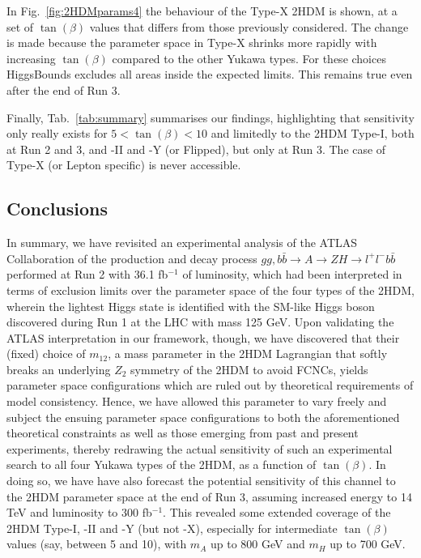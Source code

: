 In Fig.~\ref{fig:2HDMparams4} the behaviour of the Type-X 2HDM is shown, at a set of \(\tan(\beta)\) values that differs from those previously considered.
The change is made because the parameter space in Type-X shrinks more rapidly with increasing \(\tan(\beta)\) compared to the other Yukawa types.
For these choices HiggsBounds excludes all areas inside the expected limits.
This remains true even after the end of Run 3.

Finally, Tab.~\ref{tab:summary} summarises our findings, highlighting that sensitivity only really exists for $5<\tan(\beta)<10$ and limitedly to the 2HDM Type-I, both at Run 2 and 3, and -II and -Y (or Flipped), but only at Run 3. The case of Type-X (or Lepton specific) is never accessible.


\subsection{Conclusions}
In summary, we have revisited an experimental analysis of the ATLAS Collaboration of the production and decay process $gg,b\bar b\to A\to ZH\to l^+l^-b\bar b$ performed at Run 2 with 36.1 fb$^{-1}$ of luminosity, which had been interpreted in terms of exclusion limits over the parameter space of the four types of the 2HDM, wherein the lightest Higgs state is identified with the SM-like Higgs boson discovered during Run 1 at the LHC with mass 125 GeV. Upon validating the ATLAS interpretation in our framework, though, we have discovered that their (fixed) choice of $m_{12}$, a mass parameter in the 2HDM Lagrangian that softly breaks an underlying $Z_2$ symmetry of the 2HDM to avoid FCNCs, yields parameter space configurations which are ruled out by theoretical requirements of model consistency. Hence, we have allowed this parameter to vary freely and subject the ensuing parameter space configurations to both the aforementioned theoretical constraints as well as those emerging from past and present experiments, thereby redrawing the actual sensitivity of such an experimental search to all four Yukawa types of the 2HDM, as a function of $\tan(\beta)$. In doing so, we have have also forecast the potential sensitivity of this channel to the 2HDM parameter space at the end of Run 3, assuming increased energy to 14 TeV and luminosity to 300 fb$^{-1}$.
This revealed some extended coverage of the 2HDM Type-I, -II and -Y (but not -X),
especially for intermediate $\tan(\beta)$ values (say, between  5 and 10), with $m_A$ up to 800 GeV and $m_H$ up to 700 GeV.
